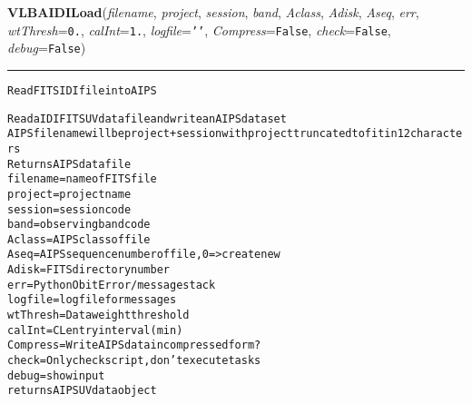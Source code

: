 \begin{boxedminipage}{\textwidth}
    \vspace{1ex}

    \end{boxedminipage}

    \label{VLBACal:VLBAIDILoad}
    \vspace{0.5ex}

    \begin{boxedminipage}{\textwidth}

    \raggedright \textbf{VLBAIDILoad}(\textit{filename}, \textit{project}, \textit{session}, \textit{band}, \textit{Aclass}, \textit{Adisk}, \textit{Aseq}, \textit{err}, \textit{wtThresh}=\texttt{0\-.\-}, \textit{calInt}=\texttt{1\-.\-}, \textit{logfile}=\texttt{'\-'\-}, \textit{Compress}=\texttt{F\-a\-l\-s\-e\-}, \textit{check}=\texttt{F\-a\-l\-s\-e\-}, \textit{debug}=\texttt{F\-a\-l\-s\-e\-})

    \vspace{-1.5ex}

    \rule{\textwidth}{0.5\fboxrule}
\begin{alltt}
Read FITS IDI file into AIPS

Read a IDI FITS UV data file and write an AIPS data set
AIPS file name will be project+session with project truncated to fit in 12 characters
Returns AIPS data file
filename   = name of FITS file
project    = project name
session    = session code
band       = observing band code
Aclass     = AIPS class of file
Aseq       = AIPS sequence number of file, 0={\textgreater} create new
Adisk      = FITS directory number
err        = Python Obit Error/message stack
logfile    = logfile for messages
wtThresh   = Data weight threshold
calInt     = CL entry interval (min)
Compress   = Write AIPS data in compressed form?
check      = Only check script, don't execute tasks
debug      = show input
returns AIPS UV data object\end{alltt}

    \vspace{1ex}

    \end{boxedminipage}

    \label{VLBACal:VLBAImageCals}
    \vspace{0.5ex}

